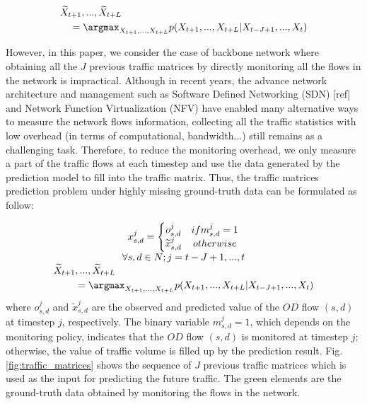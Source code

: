 \begin{equation}
\begin{aligned}
&\widetilde{X}_{t+1},...,\widetilde{X}_{t+L} \\
	&\quad = \argmax_{X_{t+1},...,X_{t+L}} p(X_{t+1},...,X_{t+L} | X_{t-J+1},...,X_{t})
\end{aligned}
\end{equation}

However, in this paper, we consider the case of backbone network where obtaining all the $J$ previous traffic matrices by directly monitoring all the flows in the network is impractical. Although in recent years, the advance network architecture and management such as Software Defined Networking (SDN) [ref] and Network Function Virtualization (NFV) have enabled many alternative ways to measure the network flows information, collecting all the traffic statistics with low overhead (in terms of computational, bandwidth...) still remains as a challenging task. Therefore, to reduce the monitoring overhead, we only measure a part of the traffic flows at each timestep and use the data generated by the prediction model to fill into the traffic matrix. Thus, the traffic matrices prediction problem under highly missing ground-truth data can be formulated as follow:

\begin{equation}
\label{equation:tm_prediction_missing_data}
\begin{matrix}
x_{s,d}^{j}=\left\{\begin{matrix}
o_{s,d}^j & if m_{s,d}^j=1 \\
\widetilde{x}_{s,d}^j & otherwise
\end{matrix}\right. \\
\forall s, d \in N; j = t - J + 1,...,t \\
\begin{aligned}
\widetilde{X}_{t+1}&,...,\widetilde{X}_{t+L} \\
	& = \argmax_{X_{t+1},...,X_{t+L}} p(X_{t+1},...,X_{t+L} |  X_{t-J+1},...,X_{t})
\end{aligned}
\end{matrix}
\end{equation} where $o_{s,d}^j$ and $\widetilde{x}_{s,d}^j$ are the observed and predicted value of the $OD$ flow $(s,d)$ at timestep $j$, respectively. The binary variable $m_{s,d}^j=1$, which depends on the monitoring policy, indicates that the $OD$ flow $(s,d)$ is monitored at timestep $j$; otherwise, the value of traffic volume is filled up by the prediction result. Fig.\ref{fig:traffic_matrices} shows the sequence of $J$ previous traffic matrices which is used as the input for predicting the future traffic. The green elements are the ground-truth data obtained by monitoring the flows in the network. 

